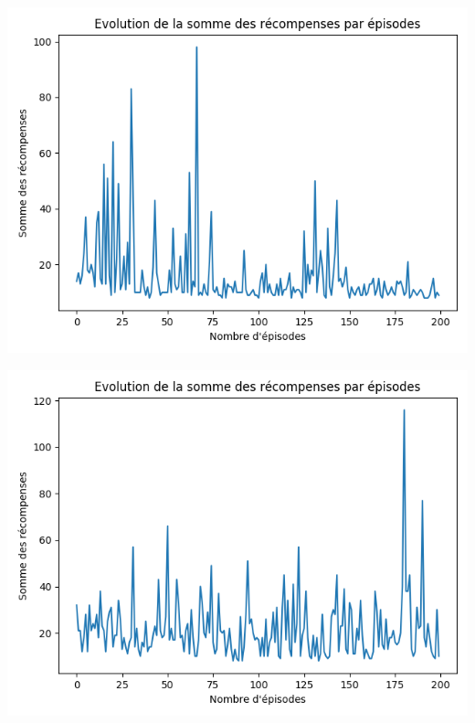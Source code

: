 \documentclass[10pt,a4paper]{article}
\begin{document}
\begin{minipage}{.5\textwidth}
  \centering
  \includegraphics[scale=0.3]{tarnetRelu30.png}
\end{minipage}%
\begin{minipage}{.5\textwidth}
  \centering
  \includegraphics[scale=0.3]{tarnetRelu1024.png}
\end{minipage}
\end{document}
